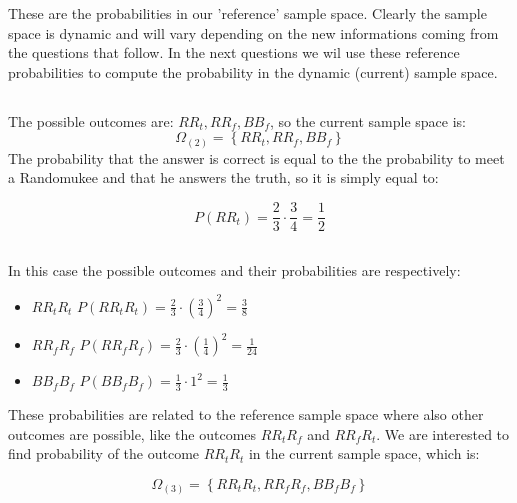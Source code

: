 \documentclass{article}
\begin{document}
These are the probabilities in our 'reference' sample space. Clearly the sample space is dynamic and will vary depending on the new informations coming from the questions that follow. 
In the next questions we wil use these reference probabilities to compute the probability in the dynamic (current) sample space.



\subsection{}
The possible outcomes are: $ RR_{t}, RR_{f}, BB_{f} $, so the current sample space is:
\begin{equation} \label{eq:sampleSpace2.1}
\Omega_{(2)} =  \left\{ RR_{t}, RR_{f}, BB_{f}   \right\}
\end{equation}
The probability that the answer is correct is equal to the the probability to meet a Randomukee and that he answers the truth, so it is simply equal to:

\begin{equation} \label{eq:prob2.1}
P(RR_{t}) = \frac {2} {3} \cdot \frac {3} {4} = \frac {1} {2}
\end{equation}



\subsection{}
In this case the possible outcomes and their probabilities are respectively:
\begin{itemize}
	\item $RR_{t}R_{t}$ 		\space\space\space		$P(RR_{t}R_{t}) = \frac {2} {3} \cdot  \left( \frac{3} {4} \right)^{2} = \frac {3} {8}$
	\item $RR_{f}R_{f}$		\space\space\space		$P(RR_{f}R_{f}) = \frac {2} {3} \cdot  \left( \frac{1} {4} \right)^{2} = \frac {1} {24}$
	\item  $BB_{f}B_{f}$		\space\space\space		$P(BB_{f}B_{f}) = \frac {1} {3} \cdot 1^{2} = \frac {1} {3}$
\end{itemize}

These probabilities are related to the reference sample space where also other outcomes are possible, like the outcomes $RR_{t}R_{f}$ and $RR_{f}R_{t}$. We are interested
to find probability of the outcome $RR_{t}R_{t}$ in the current sample space, which is:


\begin{equation} \label{eq:sampleSpace2.2}
\Omega_{(3)} =  \left\{ RR_{t}R_{t}, RR_{f}R_{f}, BB_{f}B_{f}   \right\}
\end{equation}
\end{document}
